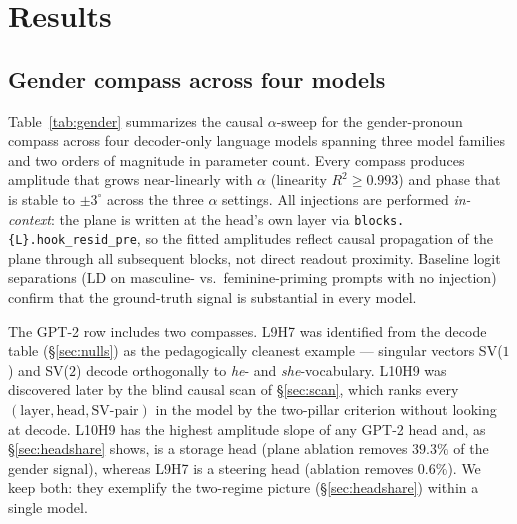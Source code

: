 \section{Results}
\label{sec:results}

\subsection{Gender compass across four models}
\label{sec:gender}

Table~\ref{tab:gender} summarizes the causal $\alpha$-sweep for the
gender-pronoun compass across four decoder-only language models
spanning three model families and two orders of magnitude in parameter
count. Every compass produces amplitude that grows near-linearly with
$\alpha$ (linearity $R^2 \ge 0.993$) and phase that is stable to
$\pm 3^\circ$ across the three $\alpha$ settings.
All injections are performed \emph{in-context}: the plane is written at
the head's own layer via \texttt{blocks.\{L\}.hook\_resid\_pre}, so the
fitted amplitudes reflect causal propagation of the plane through all
subsequent blocks, not direct readout proximity. Baseline logit
separations ($\mathrm{LD}$ on masculine- vs.\ feminine-priming prompts
with no injection) confirm that the ground-truth signal is substantial
in every model.

The GPT-2 row includes two compasses. L9H7 was identified from the
decode table (\S\ref{sec:nulls}) as the pedagogically cleanest example
--- singular vectors SV($1$) and SV($2$) decode orthogonally to
\emph{he}- and \emph{she}-vocabulary. L10H9 was discovered later by
the blind causal scan of \S\ref{sec:scan}, which ranks every
$(\text{layer}, \text{head}, \text{SV-pair})$ in the model by the
two-pillar criterion without looking at decode. L10H9 has the highest
amplitude slope of any GPT-2 head and, as \S\ref{sec:headshare} shows,
is a storage head (plane ablation removes $39.3\%$ of the gender
signal), whereas L9H7 is a steering head (ablation removes $0.6\%$).
We keep both: they exemplify the two-regime picture
(\S\ref{sec:headshare}) within a single model.

